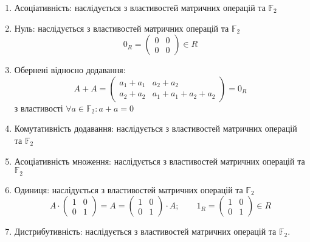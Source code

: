 \documentclass[11pt, a4paper]{article} %
\newcommand{\F}{\mathbb{F}}
\begin{document}
\begin{enumerate}
    \item Асоціативність: наслідується з властивостей матричних операцій та $\F_2$
    \item Нуль: наслідується з властивостей матричних операцій та $\F_2$
    \[0_R = \begin{pmatrix}
        0 & 0 \\ 0 & 0
    \end{pmatrix} \in R\]
    \item Обернені відносно додавання:\\
    \[A + A = \begin{pmatrix}
        a_1 + a_1 & a_2 + a_2 \\ a_2 + a_2 & a_1 + a_1 + a_2 + a_2
    \end{pmatrix} = 0_R\] з властивості $\forall a\in\F_2: a+a=0$
    \item Комутативність додавання: наслідується з властивостей матричних операцій та $\F_2$
    \item Асоціативність множення: наслідується з властивостей матричних операцій та $\F_2$
    \item Одиниця: наслідується з властивостей матричних операцій та $\F_2$
    \[A \cdot \begin{pmatrix}
        1 & 0 \\ 0 & 1
    \end{pmatrix} = A = \begin{pmatrix}
        1 & 0 \\ 0 & 1
    \end{pmatrix} \cdot A;\qquad
    1_R = \begin{pmatrix}
        1 & 0 \\ 0 & 1
    \end{pmatrix} \in R\]
    \item Дистрибутивність: наслідується з властивостей матричних операцій та $\F_2$.
\end{enumerate}
\end{document}

